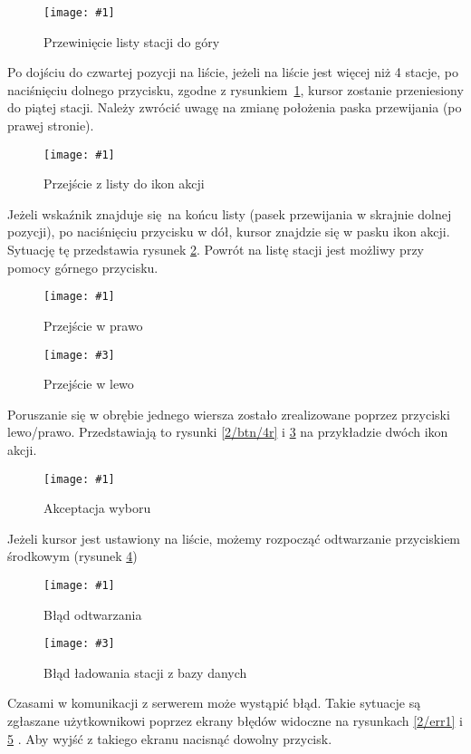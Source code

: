 \documentclass[12pt]{report}
\newcommand{\imgh}[3]{
	\begin{figure}[H]
		\centering
		\texttt{[image: \#1]}
		\caption{#2}
		\label{#1}
	\end{figure}
}
\newcommand{\imghss}[4]{
	\begin{figure}[H]
		\centering
		\begin{minipage}{.45\textwidth}
			\centering
			\texttt{[image: \#1]}
			\caption{#2}
			\label{#1}
		\end{minipage}%
		\hfill
		\begin{minipage}{.45\textwidth}
			\centering
			\texttt{[image: \#3]}
			\caption{#4}
			\label{#3}
		\end{minipage}
	\end{figure}
}
\begin{document}
		\imgh{2/btn/2}{Przewinięcie listy stacji do góry}{0.7}
		Po dojściu do czwartej pozycji na liście, jeżeli na liście jest więcej niż 4 stacje, po naciśnięciu dolnego przycisku, zgodne z rysunkiem~\ref{2/btn/2}, kursor zostanie przeniesiony do piątej stacji. Należy zwrócić uwagę na zmianę położenia paska przewijania (po prawej stronie).
		
		\imgh{2/btn/3}{Przejście z listy do ikon akcji}{0.7}
		Jeżeli wskaźnik znajduje się na końcu listy (pasek przewijania w skrajnie dolnej pozycji), po naciśnięciu przycisku w dół, kursor znajdzie się w pasku ikon akcji. Sytuację tę przedstawia rysunek \ref{2/btn/3}. Powrót na listę stacji jest możliwy przy pomocy górnego przycisku.
		
		\imghss{2/btn/4r}{Przejście w prawo}{2/btn/4l}{Przejście w lewo}
		Poruszanie się w obrębie jednego wiersza zostało zrealizowane poprzez przyciski \mbox{lewo/prawo}. Przedstawiają to rysunki \ref{2/btn/4r} i \ref{2/btn/4l} na przykładzie dwóch ikon akcji.
		
		\imgh{2/btn/5}{Akceptacja wyboru}{0.7}
		Jeżeli kursor jest ustawiony na liście, możemy rozpocząć odtwarzanie przyciskiem środkowym (rysunek \ref{2/btn/5})
		
		\imghss{2/err1}{Błąd odtwarzania}{2/err2}{Błąd ładowania stacji z bazy danych}
		Czasami w komunikacji z serwerem może wystąpić błąd. Takie sytuacje są zgłaszane użytkownikowi poprzez ekrany błędów widoczne na rysunkach \ref{2/err1} i \ref{2/err2} . Aby wyjść z takiego ekranu nacisnąć dowolny przycisk.
	
\end{document}
